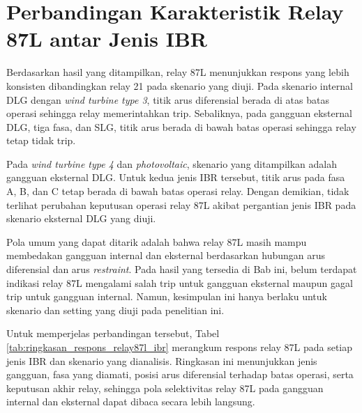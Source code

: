 \section{Perbandingan Karakteristik Relay 87L antar Jenis IBR}

Berdasarkan hasil yang ditampilkan, relay 87L menunjukkan respons yang lebih konsisten dibandingkan relay 21 pada skenario yang diuji. Pada skenario internal DLG dengan \textit{wind turbine type 3}, titik arus diferensial berada di atas batas operasi sehingga relay memerintahkan trip. Sebaliknya, pada gangguan eksternal DLG, tiga fasa, dan SLG, titik arus berada di bawah batas operasi sehingga relay tetap tidak trip.

Pada \textit{wind turbine type 4} dan \textit{photovoltaic}, skenario yang ditampilkan adalah gangguan eksternal DLG. Untuk kedua jenis IBR tersebut, titik arus pada fasa A, B, dan C tetap berada di bawah batas operasi relay. Dengan demikian, tidak terlihat perubahan keputusan operasi relay 87L akibat pergantian jenis IBR pada skenario eksternal DLG yang diuji.

Pola umum yang dapat ditarik adalah bahwa relay 87L masih mampu membedakan gangguan internal dan eksternal berdasarkan hubungan arus diferensial dan arus \textit{restraint}. Pada hasil yang tersedia di Bab ini, belum terdapat indikasi relay 87L mengalami salah trip untuk gangguan eksternal maupun gagal trip untuk gangguan internal. Namun, kesimpulan ini hanya berlaku untuk skenario dan setting yang diuji pada penelitian ini.

Untuk memperjelas perbandingan tersebut, Tabel \ref{tab:ringkasan_respons_relay87l_ibr} merangkum respons relay 87L pada setiap jenis IBR dan skenario yang dianalisis. Ringkasan ini menunjukkan jenis gangguan, fasa yang diamati, posisi arus diferensial terhadap batas operasi, serta keputusan akhir relay, sehingga pola selektivitas relay 87L pada gangguan internal dan eksternal dapat dibaca secara lebih langsung.


